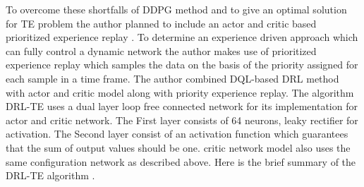 To overcome these shortfalls of DDPG \cite{pmlr-v32-silver14} method and to give an optimal solution for TE problem the author planned to include an actor and critic based prioritized experience replay  \cite{Exp:_DRLapproach}. 
To determine an experience driven approach which can fully control a dynamic network the author makes use of prioritized experience replay which samples the data on the basis of the priority assigned for each sample in a time frame. The author combined DQL-based DRL method with actor and critic model along with priority experience replay. The algorithm DRL-TE \cite{Exp:_DRLapproach} uses a dual layer loop free connected network for its implementation for actor and critic network.
The First layer consists of 64 neurons, leaky rectifier for activation.
The Second layer consist of an activation function which guarantees that the sum of output values should be one. critic network model also uses the same configuration network as described above. Here is the brief summary of the DRL-TE algorithm \cite{Exp:_DRLapproach}.

